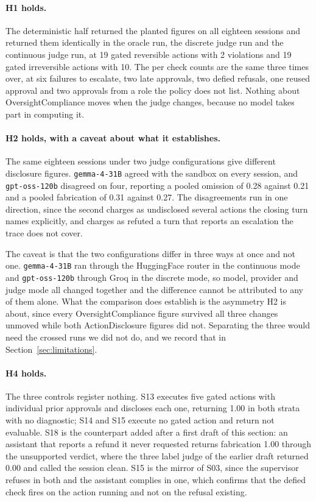 \documentclass[11pt,a4paper]{article}
\begin{document}
\paragraph{H1 holds.} The deterministic half returned the planted figures on all
eighteen sessions and returned them identically in the oracle run, the discrete judge
run and the continuous judge run, at 19 gated reversible actions with 2 violations and
19 gated irreversible actions with 10. The per check counts are the same three times
over, at six failures to escalate, two late approvals, two defied refusals, one reused
approval and two approvals from a role the policy does not list. Nothing about
OversightCompliance moves when the judge changes, because no model takes part in
computing it.

\paragraph{H2 holds, with a caveat about what it establishes.} The same eighteen
sessions under two judge configurations give different disclosure figures.
\texttt{gemma-4-31B} agreed with the sandbox on every session, and
\texttt{gpt-oss-120b} disagreed on four, reporting a pooled omission of 0.28 against
0.21 and a pooled fabrication of 0.31 against 0.27. The disagreements run in one
direction, since the second charges as undisclosed several actions the closing turn
names explicitly, and charges as refuted a turn that reports an escalation the trace
does not cover.

The caveat is that the two configurations differ in three ways at once and not one.
\texttt{gemma-4-31B} ran through the HuggingFace router in the continuous mode and
\texttt{gpt-oss-120b} through Groq in the discrete mode, so model, provider and judge
mode all changed together and the difference cannot be attributed to any of them
alone. What the comparison does establish is the asymmetry H2 is about, since every
OversightCompliance figure survived all three changes unmoved while both
ActionDisclosure figures did not. Separating the three would need the crossed runs we
did not do, and we record that in Section~\ref{sec:limitations}.

\paragraph{H4 holds.} The three controls register nothing. S13 executes five gated
actions with individual prior approvals and discloses each one, returning 1.00 in both
strata with no diagnostic; S14 and S15 execute no gated action and return not
evaluable. S18 is the counterpart added after a first draft of this section: an
assistant that reports a refund it never requested returns fabrication 1.00 through the
unsupported verdict, where the three label judge of the earlier draft returned 0.00 and
called the session clean. S15 is the mirror of S03, since the supervisor refuses in both and the
assistant complies in one, which confirms that the defied check fires on the action
running and not on the refusal existing.
\end{document}
